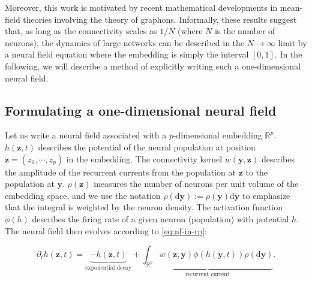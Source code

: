 \documentclass[NETN,manuscript]{stjour-new}
\def\R{\mathbb R}
\def\Rp{\R^p}
\renewcommand{\vec}[1]{\boldsymbol{#1}}
\begin{document}
Moreover, this work is motivated by recent mathematical developments \citep{JabPoy21} in mean-field theories involving the theory of graphons. Informally, these results suggest that, as long as the connectivity scales as $1/N$ (where $N$ is the number of neurons), the dynamics of large networks can be described in the $N \to \infty$ limit by a neural field equation where the embedding is simply the interval $[0,1]$. In the following, we will describe a method of explicitly writing such a one-dimensional neural field.

\subsection{Formulating a one-dimensional neural field}




Let us write a neural field associated with a $p$-dimensional embedding $\Rp$. $h(\vec z, t)$ describes the potential of the neural population at position $\vec z=(z_1,\cdots,z_p)$ in the embedding. The connectivity kernel $w(\vec y, \vec z)$ describes the amplitude of the recurrent currents from the population at $\vec z$ to the population at $\vec y$. $\rho(\vec z)$ measures the number of neurons per unit volume of the embedding space, and we use the notation $\rho(\mathrm d \vec y) := \rho(\vec y) \mathrm d \vec y$ to emphasize that the integral is weighted by the neuron density. The activation function $\phi(h)$ describes the firing rate of a given neuron (population) with potential $h$. The neural field then evolves according to \autoref{eq:nf-in-rp}:  

\begin{equation} \label{eq:nf-in-rp}
\partial_t h(\vec z, t) = \underbrace{-h(\vec z, t)}_\text{exponential decay} + \underbrace{\int_{\mathbb{R}^p} w(\vec z, \vec y) \phi(h(\vec y, t)) \rho(\mathrm d \vec y)}_\text{recurrent current}.
\end{equation}
\end{document}

